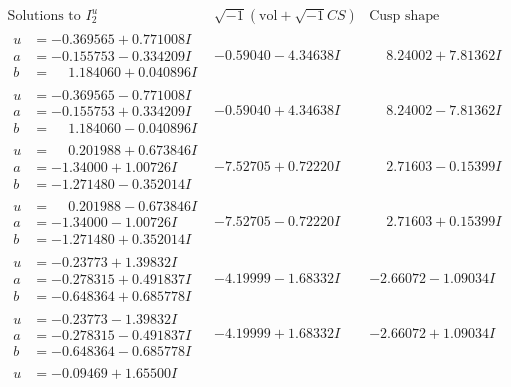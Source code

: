 \documentclass[1p]{elsarticle_modified}
\theoremstyle{definition}
\newcommand{\I}{\sqrt{-1}}
\begin{document}
$$\begin{array}{c|c|c}  
\text{Solutions to }I^u_{2}& \I (\text{vol} + \sqrt{-1}CS) & \text{Cusp shape}\\
 \hline 
\begin{aligned}
u &= -0.369565 + 0.771008 I \\
a &= -0.155753 - 0.334209 I \\
b &= \phantom{-}1.184060 + 0.040896 I\end{aligned}
 & -0.59040 - 4.34638 I & \phantom{-}8.24002 + 7.81362 I \\ \hline\begin{aligned}
u &= -0.369565 - 0.771008 I \\
a &= -0.155753 + 0.334209 I \\
b &= \phantom{-}1.184060 - 0.040896 I\end{aligned}
 & -0.59040 + 4.34638 I & \phantom{-}8.24002 - 7.81362 I \\ \hline\begin{aligned}
u &= \phantom{-}0.201988 + 0.673846 I \\
a &= -1.34000 + 1.00726 I \\
b &= -1.271480 - 0.352014 I\end{aligned}
 & -7.52705 + 0.72220 I & \phantom{-}2.71603 - 0.15399 I \\ \hline\begin{aligned}
u &= \phantom{-}0.201988 - 0.673846 I \\
a &= -1.34000 - 1.00726 I \\
b &= -1.271480 + 0.352014 I\end{aligned}
 & -7.52705 - 0.72220 I & \phantom{-}2.71603 + 0.15399 I \\ \hline\begin{aligned}
u &= -0.23773 + 1.39832 I \\
a &= -0.278315 + 0.491837 I \\
b &= -0.648364 + 0.685778 I\end{aligned}
 & -4.19999 - 1.68332 I & -2.66072 - 1.09034 I \\ \hline\begin{aligned}
u &= -0.23773 - 1.39832 I \\
a &= -0.278315 - 0.491837 I \\
b &= -0.648364 - 0.685778 I\end{aligned}
 & -4.19999 + 1.68332 I & -2.66072 + 1.09034 I \\ \hline\begin{aligned}
u &= -0.09469 + 1.65500 I \\

\end{aligned}
\end{array}$$
\end{document}
